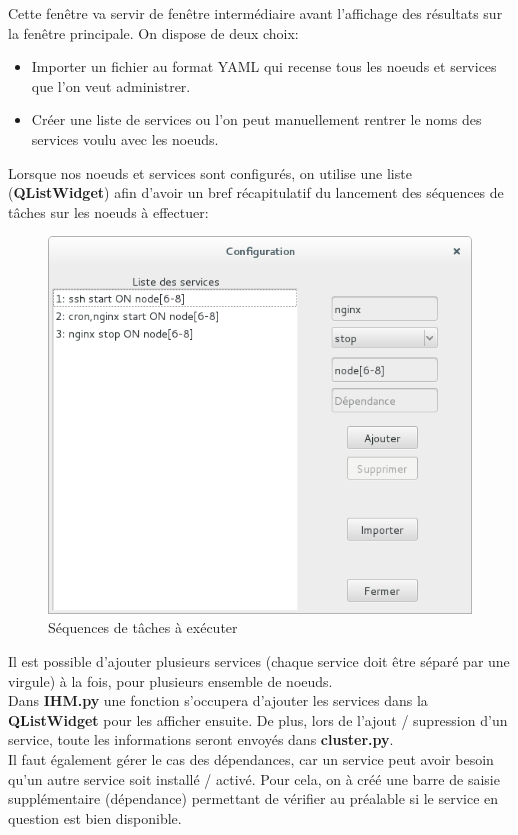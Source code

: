 \documentclass[a4paper,11pt]{article}
\begin{document}
Cette fenêtre va servir de fenêtre intermédiaire avant l'affichage des résultats sur la fenêtre principale. 
On dispose de deux choix:
\begin{itemize}
\item Importer un fichier au format YAML qui recense tous les noeuds et services que l'on veut administrer.
\item Créer une liste de services ou l'on peut manuellement rentrer le noms des services voulu avec les noeuds.
\end{itemize}
Lorsque nos noeuds et services sont configurés, on utilise une liste (\textbf{QListWidget}) afin d'avoir un bref récapitulatif du lancement des séquences de tâches sur les noeuds à effectuer:
\begin{figure}[H]
\centering
\includegraphics[scale=0.5]{exemple_config_service.png}
\caption{Séquences de tâches à exécuter}
\end{figure}
Il est possible d'ajouter plusieurs services (chaque service doit être séparé par une virgule) à la fois, pour plusieurs ensemble de noeuds.\\
Dans \textbf{IHM.py} une fonction s'occupera d'ajouter les services dans la \textbf{QListWidget} pour les afficher ensuite. De plus,  lors de l'ajout / supression d'un service, toute les informations seront envoyés dans \textbf{cluster.py}.\\
Il faut également gérer le cas des dépendances, car un service peut avoir besoin qu'un autre service soit installé / activé. Pour cela, on à créé une barre de saisie supplémentaire (dépendance) permettant de vérifier au préalable si le service en question est bien disponible.
\end{document}
